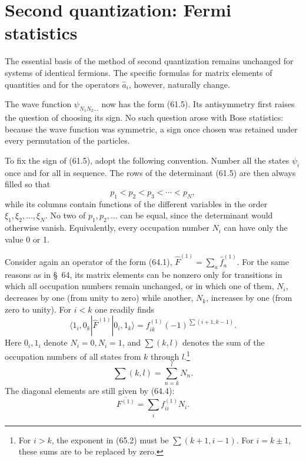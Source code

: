 \section{Second quantization: Fermi statistics}

The essential basis of the method of second quantization remains unchanged
for systems of identical fermions. The specific formulas for matrix elements
of quantities and for the operators $\hat a_i$, however, naturally change.

The wave function $\psi_{N_1N_2\ldots}$ now has the form (61.5). Its
antisymmetry first raises the question of choosing its sign. No such question
arose with Bose statistics: because the wave function was symmetric, a sign
once chosen was retained under every permutation of the particles.

To fix the sign of (61.5), adopt the following convention. Number all the
states $\psi_i$ once and for all in sequence. The rows of the determinant
(61.5) are then always filled so that
\begin{equation}
 p_1<p_2<p_3<\cdots<p_N,
 \tag{65.1}
\end{equation}
while its columns contain functions of the different variables in the order
$\xi_1,\xi_2,\ldots,\xi_N$. No two of $p_1,p_2,\ldots$ can be equal, since
the determinant would otherwise vanish. Equivalently, every occupation number
$N_i$ can have only the value 0 or 1.

Consider again an operator of the form (64.1),
$\hat F^{(1)}=\sum_a\hat f_a^{(1)}$. For the same reasons as in \S~64, its
matrix elements can be nonzero only for transitions in which all occupation
numbers remain unchanged, or in which one of them, $N_i$, decreases by one
(from unity to zero) while another, $N_k$, increases by one (from zero to
unity). For $i<k$ one readily finds
\begin{equation}
 \langle1_i,0_k|\hat F^{(1)}|0_i,1_k\rangle
 =f_{ik}^{(1)}(-1)^{\sum(i+1,k-1)}.
 \tag{65.2}
\end{equation}
Here $0_i,1_i$ denote $N_i=0,N_i=1$, and $\sum(k,l)$ denotes the sum of the
occupation numbers of all states from $k$ through $l$.\footnote{For $i>k$,
the exponent in (65.2) must be $\sum(k+1,i-1)$. For $i=k\pm1$, these sums are
to be replaced by zero.}
\[
 \sum(k,l)=\sum_{n=k}^lN_n.
\]
The diagonal elements are still given by (64.4):
\begin{equation}
 \overline{F^{(1)}}=\sum_i f_{ii}^{(1)}N_i.
 \tag{65.3}
\end{equation}

